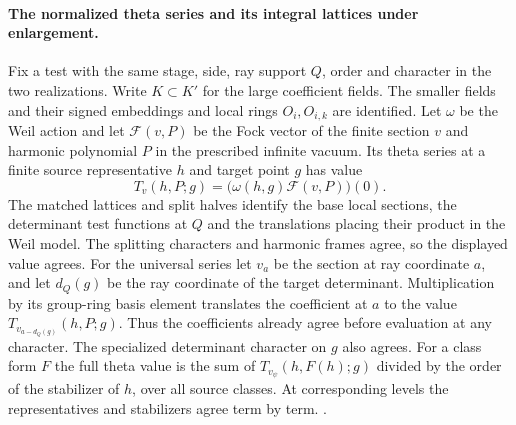 \paragraph{The normalized theta series and its integral lattices under enlargement.}
%
Fix a test with the same stage, side, ray support \(Q\), order
and character in the two realizations. Write \(K\subset K'\)
for the large coefficient fields. The smaller fields and their
signed embeddings and local rings \(O_i,O_{i,k}\) are identified.
Let \(\omega\) be the Weil action and let \(\mathcal F(v,P)\)
be the Fock vector of the finite section \(v\) and harmonic
polynomial \(P\) in the prescribed infinite vacuum. Its theta
series at a finite source representative \(h\) and target point
\(g\) has value
\[
 T_v(h,P;g)=\bigl(\omega(h,g)\mathcal F(v,P)\bigr)(0).
\]
The matched lattices and split halves identify the base local
sections, the determinant test functions at \(Q\) and the
translations placing their product in the Weil model. The
splitting characters and harmonic frames agree, so the displayed
value agrees. For the universal series let \(v_a\) be the section
at ray coordinate \(a\), and let \(d_Q(g)\) be the ray coordinate
of the target determinant. Multiplication by its group-ring basis
element translates the coefficient at \(a\) to the value
\(T_{v_{a-d_Q(g)}}(h,P;g)\). Thus the coefficients already agree
before evaluation at any character. The specialized determinant
character on \(g\) also agrees. For a class form \(F\) the full
theta value is the sum of \(T_{v_\psi}(h,F(h);g)\) divided by
the order of the stabilizer of \(h\), over all source classes.
At corresponding levels the representatives and stabilizers agree
term by term.
.

